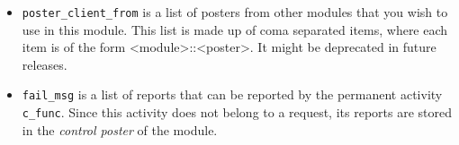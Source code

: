 \begin{itemize}
\item {\tt poster\_client\_from} is a list of posters from other modules
that  you wish  to use  in this  module.  This list is   made  up of coma
separated items,  where each item is  of the  form <module>::<poster>. It
might be deprecated in future releases.

\item {\tt fail\_msg} is a list of reports that can be reported by the
permanent activity {\tt c\_func}. Since  this activity does not belong to
a request, its  reports are  stored in  the  {\em control poster} of  the
module.
\end{itemize}

